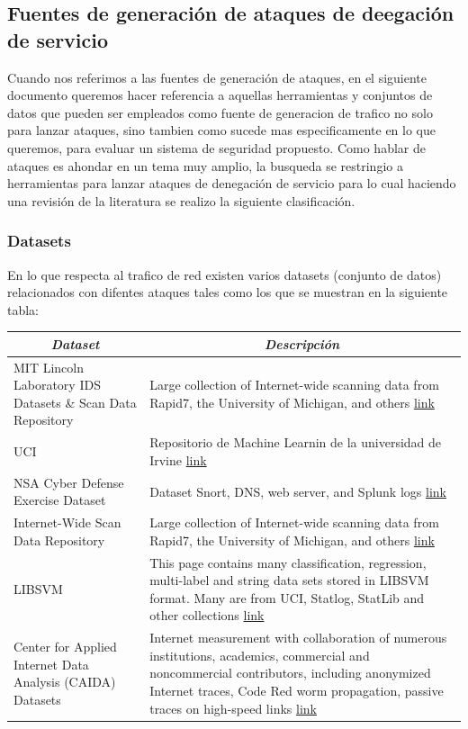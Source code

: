 \documentclass[12pt]{article}
\begin{document}
\subsection{Fuentes de generación de ataques de deegación de servicio}

Cuando nos referimos a las fuentes de generación de ataques, en el siguiente documento queremos hacer referencia a aquellas herramientas y conjuntos de datos que pueden ser empleados como fuente de generacion de trafico no solo para lanzar ataques, sino tambien como sucede mas especificamente en lo que queremos, para evaluar un sistema de seguridad propuesto. Como hablar de ataques es ahondar en un tema muy amplio, la busqueda se restringio a herramientas para lanzar ataques de denegación de servicio para lo cual haciendo una revisión de la literatura se realizo la siguiente clasificación.

\subsubsection{Datasets}

En lo que respecta al trafico de red existen varios datasets (conjunto de datos) relacionados con difentes ataques tales como los que se muestran en la siguiente tabla:

\begin{table}[htbp]
\centering
\begin{tabular}{|p{0.3\linewidth}|p{0.7\linewidth}|}
\hline
\multicolumn{1}{|c|}{\textit{\textbf{Dataset}}} & \multicolumn{1}{c|}{\textit{\textbf{Descripción}}} \tabularnewline \hline
MIT Lincoln Laboratory IDS Datasets \& Scan Data Repository & Large collection of Internet-wide scanning data from Rapid7, the University of Michigan, and others \href{https://scans.io/}{link}  \tabularnewline \hline
UCI & Repositorio de Machine Learnin de la universidad de Irvine \href{https://archive.ics.uci.edu/ml/datasets.html}{link}  \tabularnewline \hline
NSA Cyber Defense Exercise Dataset & Dataset Snort, DNS, web server, and Splunk logs \href{https://www.usma.edu/crc/SitePages/DataSets.aspx}{link} \tabularnewline \hline
Internet-Wide Scan Data Repository & Large collection of Internet-wide scanning data from Rapid7, the University of Michigan, and others \href{https://scans.io/}{link} \tabularnewline \hline
LIBSVM & This page contains many classification, regression, multi-label and string data sets stored in LIBSVM format. Many are from UCI, Statlog, StatLib and other collections \href{https://www.csie.ntu.edu.tw/~cjlin/libsvmtools/datasets/}{link}  \tabularnewline \hline
Center for Applied Internet Data Analysis (CAIDA) Datasets & Internet measurement with collaboration of numerous institutions, academics, commercial and noncommercial contributors, including anonymized Internet traces, Code Red worm propagation, passive traces on high-speed links \href{http://www.caida.org/projects/trends/imdc/}{link} \tabularnewline \hline
\end{tabular}
\end{table}
\FloatBarrier
\end{document}
